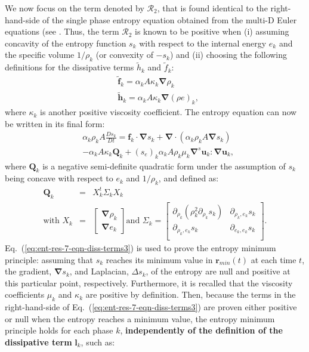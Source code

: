 \documentclass[preprint,10pt]{elsarticle}
\renewcommand{\div}{\mbold{\nabla}\! \cdot \!}
\newcommand{\grad}{\mbold{\nabla}}
\newcommand{\mbold}[1]{\boldsymbol#1}
\newcommand{\eqt}[1]{Eq.~(\ref{#1})}                     %
\begin{document}
We now focus on the term denoted by $\mathcal{R}_2$, that is found identical to the right-hand-side of the single phase entropy equation obtained from the multi-D Euler equations (see \cite{jlg, Marco_paper_low_mach}. Thus, the term $\mathcal{R}_2$ is known to be positive when (i) assuming concavity of the entropy function $s_k$ with respect to the internal energy $e_k$ and the specific volume $1 / \rho_k$ (or convexity of $-s_k$) and (ii) choosing the following definitions for the dissipative terms $\tilde{h}_k$ and $\tilde{f}_k$:
%
\begin{subequations}
\begin{align}
&\tilde{\mbold f}_k = \alpha_k A \kappa_k \grad \rho_k \\
&\tilde{\mbold h}_k = \alpha_k A \kappa_k \grad \left( \rho e \right)_k,
\end{align}
\end{subequations}
%  
where $\kappa_k$ is another positive viscosity coefficient. The entropy equation can now be written in its final form:
%
\begin{align}\label{eq:ent-res-7-eqn-diss-terms3}
&\alpha_k \rho_k A \frac{Ds_k}{Dt} =  \mbold f_k \cdot \grad s_k + \div \left( \alpha_k \rho_k A \grad s_k \right)  \nonumber\\
&- \alpha_k A \kappa_k \mathbf{Q}_k + (s_e)_k \alpha_k A \rho_k \mu_k \grad^s \mbold u_k : \grad \mbold u_k,
\end{align}
%
where $\mathbf{Q}_k$ is a negative semi-definite quadratic form under the assumption of $s_k$ being concave with respect to $e_k$ and $1/ \rho_k$, and defined as:
%
\begin{eqnarray}
\mathbf{Q}_k &=& X^t_k \Sigma_k X_k \nonumber \\
\text{with } X_k &=& \begin{bmatrix}
\grad \rho_k \\
\grad e_k 
\end{bmatrix}
\text{and } \Sigma_k = \begin{bmatrix}
       \partial_{\rho_k} (\rho^2_k \partial_{\rho_k} s_k) & \partial_{\rho_k,e_k} s_k  \\[0.3em]
       \partial_{\rho_k,e_k} s_k & \partial_{e_k,e_k} s_k           \\[0.3em]
     \end{bmatrix}. \nonumber 
\end{eqnarray}
%
\eqt{eq:ent-res-7-eqn-diss-terms3} is used to prove the entropy minimum principle: assuming that $s_k$ reaches its minimum value in $\mbold r_{min}(t)$ at each time $t$, the gradient, $\grad s_k$, and Laplacian, $\Delta s_k$,  of the entropy are null and positive at this particular point, respectively. Furthermore, it is recalled that the viscosity coefficients $\mu_k$ and $\kappa_k$ are positive by definition. Then, because the terms in the right-hand-side of \eqt{eq:ent-res-7-eqn-diss-terms3} are proven either positive or null when the entropy reaches a minimum value, the entropy minimum principle holds for each phase $k$, \textbf{independently of the definition of the dissipative term} $\mbold l_k$, such as:
\end{document}
